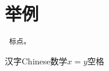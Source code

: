 \documentclass[11pt]{article}
\begin{document}
 \section{举例}
 \begin{verbatim} 标点。
 \end{verbatim}
  
 汉字Chinese数学$x=y$空格
 
\end{document}
